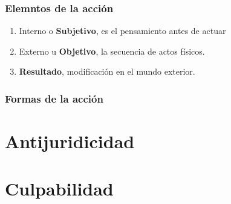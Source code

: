 \documentclass[12pt]{book}
\begin{document}
\subsubsection{Elemntos de la acción}
\begin{enumerate}
	\item Interno o \textbf{Subjetivo}, es el pensamiento antes de actuar
	\item Externo u \textbf{Objetivo}, la secuencia de actos físicos.
	\item \textbf{Resultado}, modificación en el mundo exterior.
\end{enumerate}

\subsubsection{Formas de la acción}

\section{Antijuridicidad}

\section{Culpabilidad}
\end{document}
